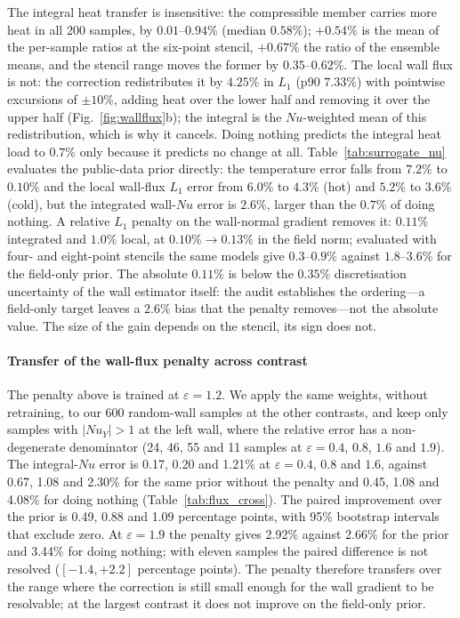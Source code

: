 \documentclass[preprint,11pt,a4paper,times,doubleblind]{elsarticle}
\begin{document}
The integral heat transfer is insensitive: the compressible member carries more heat in all 200
samples, by $0.01$--$0.94\%$ (median $0.58\%$); $+0.54\%$ is the mean of the per-sample ratios at
the six-point stencil, $+0.67\%$ the ratio of the ensemble means, and the stencil range moves the
former by $0.35$--$0.62\%$. The local wall flux is not: the correction redistributes it by $4.25\%$
in $L_1$ (p90 $7.33\%$) with pointwise excursions of $\pm10\%$, adding heat over the lower half and
removing it over the upper half (Fig.~\ref{fig:wallflux}b); the integral is the $Nu$-weighted mean
of this redistribution, which is why it cancels. Doing nothing predicts the integral heat load to
$0.7\%$ only because it predicts no change at all. Table~\ref{tab:surrogate_nu} evaluates the
public-data prior directly: the temperature error falls from $7.2\%$ to $0.10\%$ and the local
wall-flux $L_1$ error from $6.0\%$ to $4.3\%$ (hot) and $5.2\%$ to $3.6\%$ (cold), but the
integrated wall-$Nu$ error is $2.6\%$, larger than the $0.7\%$ of doing nothing. A relative $L_1$
penalty on the wall-normal gradient removes it: $0.11\%$ integrated and $1.0\%$ local, at
$0.10\%\to0.13\%$ in the field norm; evaluated with four- and eight-point stencils the same models
give $0.3$--$0.9\%$ against $1.8$--$3.6\%$ for the field-only prior. The absolute $0.11\%$ is
below the $0.35\%$ discretisation uncertainty of the wall estimator itself: the audit establishes
the ordering---a field-only target leaves a $2.6\%$ bias that the penalty removes---not the absolute
value. The size of the gain depends on the stencil, its sign does not.
\paragraph{Transfer of the wall-flux penalty across contrast}
The penalty above is trained at $\varepsilon=1.2$. We apply the same weights, without retraining, to our
600 random-wall samples at the other contrasts, and keep only samples with $|Nu_Y|>1$ at the left
wall, where the relative error has a non-degenerate denominator (24, 46, 55 and 11 samples at
$\varepsilon=0.4$, $0.8$, $1.6$ and $1.9$). The integral-$Nu$ error is 0.17, 0.20 and 1.21\% at
$\varepsilon=0.4$, $0.8$ and $1.6$, against 0.67, 1.08 and 2.30\% for the same prior without the
penalty and 0.45, 1.08 and 4.08\% for doing nothing (Table~\ref{tab:flux_cross}). The paired
improvement over the prior is 0.49, 0.88 and 1.09 percentage points, with 95\% bootstrap
intervals that exclude zero. At $\varepsilon=1.9$ the penalty gives 2.92\% against 2.66\% for the prior
and 3.44\% for doing nothing; with eleven samples the paired difference is not resolved
($[-1.4,+2.2]$ percentage points). The penalty therefore transfers over the range where the
correction is still small enough for the wall gradient to be resolvable; at the largest contrast it
does not improve on the field-only prior.
\end{document}
